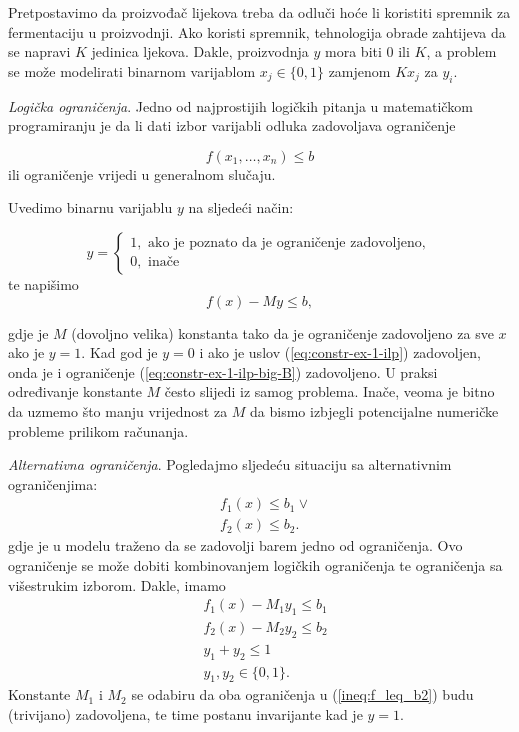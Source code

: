 \documentclass[a4paper, utf8, 11pt, colorlinks]{book}
\begin{document}
Pretpostavimo da proizvođač lijekova treba da odluči hoće li koristiti spremnik za fermentaciju u proizvodnji. Ako koristi spremnik, tehnologija obrade zahtijeva da se napravi $K$ jedinica ljekova. Dakle, proizvodnja $y$ mora biti 0 ili $K$, a problem se može modelirati binarnom varijablom $x_j \in \{ 0, 1\}$ zamjenom $Kx_j$ za $y_i$. 

\emph{Logička ograničenja}. Jedno od najprostijih logičkih pitanja u matematičkom programiranju je da li dati izbor varijabli odluka zadovoljava ograničenje

\begin{equation}\label{eq:constr-ex-1-ilp}
   f(x_1,\ldots, x_n )\leq b
\end{equation}
 ili   ograničenje vrijedi u generalnom slučaju.
 
 Uvedimo binarnu varijablu $y$ na sljedeći način:
 
$$y =\begin{cases}
1, \mbox{ ako je poznato da je ograničenje zadovoljeno}, \\
0, \mbox{ inače}
\end{cases}$$
te napišimo 
\begin{equation}\label{eq:constr-ex-1-ilp-big-B}
   f(x) - M y \leq b,
\end{equation}

gdje je $M$ (dovoljno velika) konstanta tako da je 
ograničenje zadovoljeno za sve $x$ ako je $y =1$. Kad god je $y=0$ i ako je uslov (\ref{eq:constr-ex-1-ilp}) zadovoljen, onda je i ograničenje (\ref{eq:constr-ex-1-ilp-big-B}) zadovoljeno. U praksi   određivanje konstante $M$ često slijedi iz samog problema. Inače, veoma je bitno da uzmemo što manju vrijednost za $M$ da bismo izbjegli potencijalne numeričke probleme prilikom računanja. 

\emph{Alternativna ograničenja}. Pogledajmo sljedeću situaciju sa alternativnim ograničenjima:
\begin{align}
     &f_1(x) \leq b_1 \vee \nonumber\\
     &f_2(x) \leq b_2.\label{ineq:f_leq_b2}
\end{align}
gdje je u modelu traženo da se zadovolji barem jedno od ograničenja. 
Ovo ograničenje se može dobiti kombinovanjem logičkih ograničenja te ograničenja sa višestrukim izborom. Dakle, imamo 
\begin{align*}
      &f_1(x) - M_1 y_1  \leq b_1 \\
      &f_2(x) - M_2 y_2  \leq b_2 \\
      & y_1 + y_2 \leq 1 \\
      & y_1, y_2 \in \{0, 1\}.
\end{align*}
Konstante $M_1$ i $M_2$ se odabiru da oba ograničenja u (\ref{ineq:f_leq_b2})  budu (trivijano) zadovoljena, te time postanu invarijante kad je $y=1$.
\end{document}
